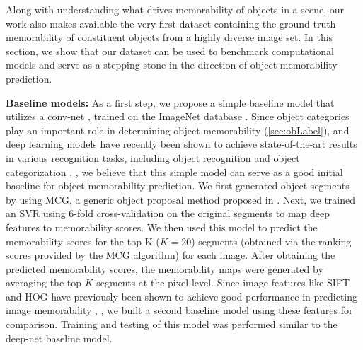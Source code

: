 Along with understanding what drives memorability of objects in a scene, our work also makes available the very first dataset containing the ground truth memorability of constituent objects from a highly diverse image set. In this section, we show that our dataset can be used to benchmark computational models and serve as a stepping stone in the direction of object memorability prediction.


\textbf{Baseline models:} As a first step, we propose a simple baseline model that utilizes a conv-net \cite{krizhevsky12}, \cite{jia14} trained on the ImageNet database \cite{deng09}. Since object categories play an important role in determining object memorability (\ref{sec:obLabel}), and deep learning models have recently been shown to achieve state-of-the-art results in various recognition tasks, including object recognition and object categorization \cite{cnn14}, \cite{lee2009convolutional}, we believe that this simple model can serve as a good initial baseline for object memorability prediction. We first generated object segments by using MCG, a generic object proposal method proposed in \cite{arbelaez14}. Next, we trained an SVR using $6$-fold cross-validation on the original segments to map deep features to memorability scores. We then used this model to predict the memorability scores for the top K ($K=20$) segments (obtained via the ranking scores provided by the MCG algorithm) for each image. After obtaining the predicted memorability scores, the memorability maps were generated by averaging the top $K$ segments at the pixel level. Since image features like SIFT \cite{lowe04} and HOG \cite{dalal05} have previously been shown to achieve good performance in predicting image memorability \cite{isola11}, \cite{isola14}, we built a second baseline model using these features for comparison. Training and testing of this model was performed similar to the deep-net baseline model.

